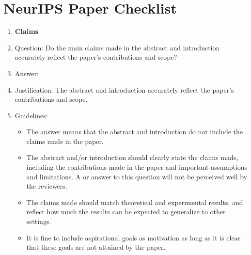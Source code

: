 \documentclass{article}
\begin{document}
\clearpage
\section*{NeurIPS Paper Checklist}

\begin{enumerate}

\item {\bf Claims}
    \item[] Question: Do the main claims made in the abstract and introduction accurately reflect the paper's contributions and scope?
    \item[] Answer: \answerYes{} %
    \item[] Justification: The abstract and introduction accurately reflect the paper's contributions and scope.
    \item[] Guidelines:
    \begin{itemize}
        \item The answer \answerNA{} means that the abstract and introduction do not include the claims made in the paper.
        \item The abstract and/or introduction should clearly state the claims made, including the contributions made in the paper and important assumptions and limitations. A \answerNo{} or \answerNA{} answer to this question will not be perceived well by the reviewers. 
        \item The claims made should match theoretical and experimental results, and reflect how much the results can be expected to generalize to other settings. 
        \item It is fine to include aspirational goals as motivation as long as it is clear that these goals are not attained by the paper. 
    \end{itemize}


\end{enumerate}
\end{document}
